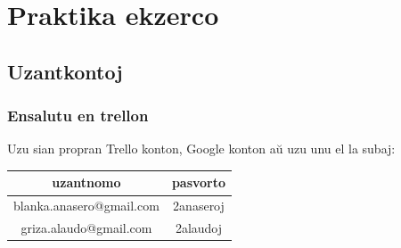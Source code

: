 \section{Praktika ekzerco}
\subsection{Uzantkontoj}
  \begin{frame}
    \frametitle{Ensalutu en trellon}

	Uzu sian propran Trello konton, Google konton aŭ uzu unu el la subaj:

\begin{center}
	\begin{tabular}{ | c | c | }
	\hline
		uzantnomo & pasvorto \\
	\hline
		blanka.anasero{@}gmail.com & 2anaseroj \\
	\hline
		griza.alaudo{@}gmail.com & 2alaudoj \\
		
	\hline  
	\end{tabular}
\end{center}

\end{frame}

